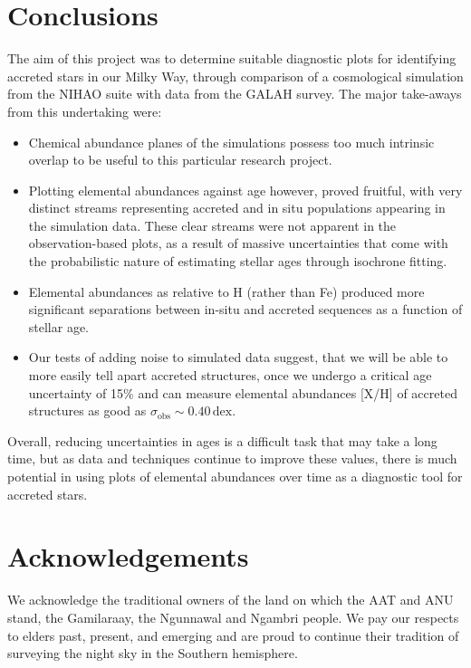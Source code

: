 \documentclass[fleqn,usenatbib]{mnras}
\begin{document}

\section{Conclusions}
\label{sec:conc}

The aim of this project was to determine suitable diagnostic plots for identifying accreted stars in our Milky Way, through comparison of a cosmological simulation from the NIHAO suite with data from the GALAH survey. The major take-aways from this undertaking were:
\begin{itemize}
\item Chemical abundance planes of the simulations possess too much intrinsic overlap to be useful to this particular research project. 
\item Plotting elemental abundances against age however, proved fruitful, with very distinct streams representing accreted and in situ populations appearing in the simulation data. These clear streams were not apparent in the observation-based plots, as a result of massive uncertainties that come with the probabilistic nature of estimating stellar ages through isochrone fitting.
\item Elemental abundances as relative to H (rather than Fe) produced more significant separations between in-situ and accreted sequences as a function of stellar age.
\item Our tests of adding noise to simulated data suggest, that we will be able to more easily tell apart accreted structures, once we undergo a critical age uncertainty of 15\% and can measure elemental abundances [X/H] of accreted structures as good as $\sigma_\text{obs} \sim 0.40\,\mathrm{dex}$.
\end{itemize}

Overall, reducing uncertainties in ages is a difficult task that may take a long time, but as data and techniques continue to improve these values, there is much potential in using plots of elemental abundances over time as a diagnostic tool for accreted stars.

\section*{Acknowledgements}

We acknowledge the traditional owners of the land on which the AAT and ANU stand, the Gamilaraay, the Ngunnawal and Ngambri people. We pay our respects to elders past, present, and emerging and are proud to continue their tradition of surveying the night sky in the Southern hemisphere.
\end{document}
